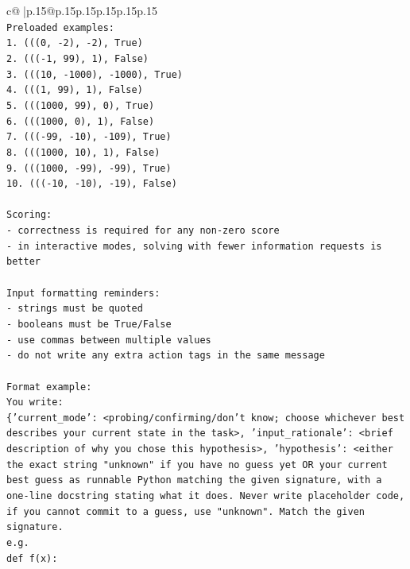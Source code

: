 \documentclass{article}
\begin{document}
{\begin{supertabular}{c@{$\;$}|p{.15\linewidth}@{}p{.15\linewidth}p{.15\linewidth}p{.15\linewidth}p{.15\linewidth}p{.15\linewidth}}
{{{\\ 
\texttt{Preloaded examples:} \\
\texttt{1. (((0, {-}2), {-}2), True)} \\
\texttt{2. ((({-}1, 99), 1), False)} \\
\texttt{3. (((10, {-}1000), {-}1000), True)} \\
\texttt{4. (((1, 99), 1), False)} \\
\texttt{5. (((1000, 99), 0), True)} \\
\texttt{6. (((1000, 0), 1), False)} \\
\texttt{7. ((({-}99, {-}10), {-}109), True)} \\
\texttt{8. (((1000, 10), 1), False)} \\
\texttt{9. (((1000, {-}99), {-}99), True)} \\
\texttt{10. ((({-}10, {-}10), {-}19), False)} \\
\\ 
\texttt{Scoring:} \\
\texttt{{-} correctness is required for any non{-}zero score} \\
\texttt{{-} in interactive modes, solving with fewer information requests is better} \\
\\ 
\texttt{Input formatting reminders:} \\
\texttt{{-} strings must be quoted} \\
\texttt{{-} booleans must be True/False} \\
\texttt{{-} use commas between multiple values} \\
\texttt{{-} do not write any extra action tags in the same message} \\
\\ 
\texttt{Format example:} \\
\texttt{You write:} \\
\texttt{\{'current\_mode': <probing/confirming/don't know; choose whichever best describes your current state in the task>, 'input\_rationale': <brief description of why you chose this hypothesis>, 'hypothesis': <either the exact string "unknown" if you have no guess yet OR your current best guess as runnable Python matching the given signature, with a one{-}line docstring stating what it does. Never write placeholder code, if you cannot commit to a guess, use "unknown". Match the given signature.} \\
\texttt{e.g.} \\
\texttt{def f(x):} \\
}}}
\end{supertabular}}
\end{document}

